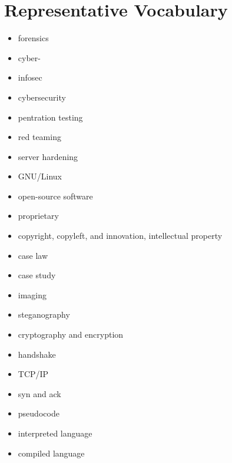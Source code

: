 \documentclass[letterpaper,10pt,english]{sphinxmanual}
\begin{document}
\section{Representative Vocabulary}
\label{cybersecurity:representative-vocabulary}\begin{itemize}
\item {} 
forensics

\item {} 
cyber-

\item {} 
infosec

\item {} 
cybersecurity

\item {} 
pentration testing

\item {} 
red teaming

\item {} 
server hardening

\item {} 
GNU/Linux

\item {} 
open-source software

\item {} 
proprietary

\item {} 
copyright, copyleft, and innovation, intellectual property

\item {} 
case law

\item {} 
case study

\item {} 
imaging

\item {} 
steganography

\item {} 
cryptography and encryption

\item {} 
handshake

\item {} 
TCP/IP

\item {} 
syn and ack

\item {} 
pseudocode

\item {} 
interpreted language

\item {} 
compiled language


\end{itemize}
\end{document}
